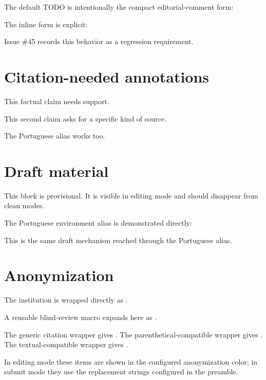 \documentclass[11pt]{article}
\begin{document}
The default TODO is intentionally the compact editorial-comment form:

The inline form is explicit:

Issue \#45 records this behavior as a regression requirement.

\section{Citation-needed annotations}

This factual claim needs support.\pleasecite

This second claim asks for a specific kind of source.

The Portuguese alias works too.

\section{Draft material}

\begin{cwdraft}
This block is provisional. It is visible in editing mode and should disappear
from clean modes.
\end{cwdraft}

The Portuguese environment alias is demonstrated directly:

\begin{rascunho}
This is the same draft mechanism reached through the Portuguese alias.
\end{rascunho}

\section{Anonymization}

The institution is wrapped directly as
.

A reusable blind-review macro expands here as \projectname.

The generic citation wrapper gives .
The parenthetical-compatible wrapper gives .
The textual-compatible wrapper gives .

In editing mode these items are shown in the configured anonymization color;
in submit mode they use the replacement strings configured in the preamble.
\end{document}
